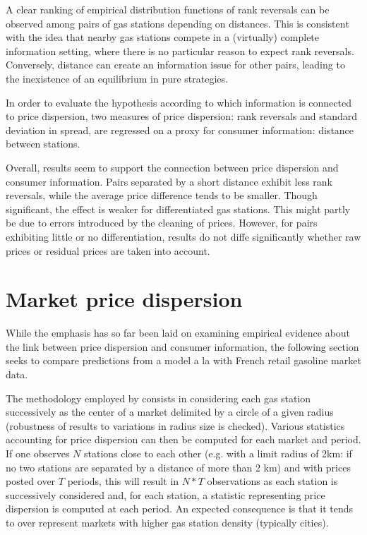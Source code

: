 \documentclass[english]{article}
\begin{document}
A clear ranking of empirical distribution functions of rank reversals can be observed among pairs of gas stations depending on distances. This is consistent with the idea that nearby gas stations compete in a (virtually) complete information setting, where there is no particular reason to expect rank reversals. Conversely, distance can create an information issue for other pairs, leading to the inexistence of an equilibrium in pure strategies.

In order to evaluate the hypothesis according to which information is connected to price dispersion, two measures of price dispersion: rank reversals and standard deviation in spread, are regressed on a proxy for consumer information: distance between stations.



Overall, results seem to support the connection between price dispersion and consumer information. Pairs separated by a short distance exhibit less rank reversals, while the average price difference tends to be smaller. Though significant, the effect is weaker for differentiated gas stations. This might partly be due to errors introduced by the cleaning of prices. However, for pairs exhibiting little or no differentiation, results do not diffe significantly whether raw prices or residual prices are taken into account.

\section{Market price dispersion}

While the emphasis has so far been laid on examining empirical evidence about the link between price dispersion and consumer information, the following section seeks to compare predictions from a model a la \cite{VAR80} with French retail gasoline market data.

The methodology employed by \cite{TAP11} consists in considering each gas station successively as the center of a market delimited by a circle of a given radius (robustness of results to variations in radius size is checked). Various statistics accounting for price dispersion can then be computed for each market and period. If one observes $N$ stations close to each other (e.g. with a limit radius of 2km: if no two stations are separated by a distance of more than 2 km) and with prices posted over $T$ periods, this will result in $N*T$ observations as each station is successively considered and, for each station, a statistic representing price dispersion is computed at each period. An expected consequence is that it tends to over represent markets with higher gas station density (typically cities).
\end{document}
